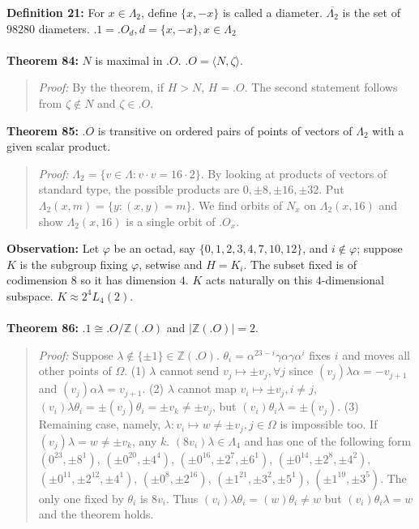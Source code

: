 {\bf Definition 21:}
For $x \in \Lambda_2$, define $\{ x , -x \}$ is called a diameter.
${\overline {\Lambda_2}}$ is the set of $98280$ diameters.
$.1= .O_d, d= \{x, -x \}, x \in \Lambda_2$ 
\\
\\
{\bf Theorem 84:} $N$ is maximal in $.O$.  $.O= \langle N, \zeta \rangle$.
\begin{quote}
\emph{Proof:} 
By the theorem, if $H>N$, $H=.O$.  The second statement follows from $\zeta \notin N$ and $\zeta \in .O$.
\end{quote}
{\bf Theorem 85:} 
$.O$ is transitive on ordered pairs of points of vectors of $\Lambda_2$ with a
given scalar product.
\begin{quote}
\emph{Proof:} 
$\Lambda_2= \{ v \in \Lambda: v \cdot v= 16 \cdot 2 \}$.  By looking at products of
vectors of standard type, the possible products are
$0, \pm 8, \pm 16, \pm 32$.  Put $\Lambda_2(x,m)= \{y: (x,y)= m \}$.
We find orbits of $N_x$ on $\Lambda_2(x,16)$ and show 
$\Lambda_2(x,16)$ is a single orbit of $.O_x$.
\end{quote}
{\bf Observation:}
Let $\varphi$ be an octad, say $\{ 0,1,2,3,4,7,10,12 \}$,
and $i \notin \varphi$; suppose $K$ is the subgroup fixing $\varphi$,
setwise and $H= K_i$.  The subset fixed is of codimension $8$ so it has dimension $4$.  $K$
acts naturally on this $4$-dimensional subspace.  $K \approx 2^4 L_4(2)$.
\\
\\
{\bf Theorem 86:} 
$.1 \cong .O/{\mathbb Z}(.O)$ and
$|{\mathbb Z}(.O)|= 2$.
\begin{quote}
\emph{Proof:} 
Suppose $\lambda \notin \{\pm1\} \in {\mathbb Z}(.O)$.
$\theta_i= \alpha^{23-i} \gamma \alpha  \gamma \alpha^i $ fixes $i$ and moves all other
points of $\Omega$.  
(1) $\lambda$ cannot send $v_j \mapsto \pm v_j, \forall j$ since
$(v_j)\lambda \alpha = - v_{j+1}$ and
$(v_j)\alpha \lambda= v_{j+1}$.  
(2) $\lambda$ cannot map $v_i \mapsto \pm v_j, i \ne j$, 
$(v_i) \lambda \theta_i= \pm (v_j) \theta_i= \pm v_k \ne \pm  v_j$, but
$(v_i) \theta_i \lambda= \pm (v_j)$.
(3) Remaining case, namely, $\lambda: v_i \mapsto w \ne \pm v_j, j \in \Omega$ is impossible too.
If $(v_j)\lambda = w \ne \pm v_k$, any $k$.  $(8v_i)\lambda \in \Lambda_4$ and has one of the following
form $(0^{23},\pm 8^{1})$, $(\pm 0^{20},\pm 4^{4})$, $(\pm 0^{16},\pm 2^{7}, \pm 6^{1})$,
$(\pm 0^{14},\pm 2^{8}, \pm 4^{2})$, $(\pm 0^{11},\pm 2^{12}, \pm 4^{1})$, $(\pm 0^{8},\pm 2^{16})$,
$(\pm 1^{21},\pm 3^{2}, \pm 5^{1})$, $(\pm 1^{19},\pm 3^{5})$.  The only one fixed by $\theta_i$ is
$8v_i$.  Thus
$(v_i) \lambda \theta_i = (w)\theta_i \ne w$ but
$(v_i) \theta_i \lambda= w$ and the theorem holds.
\end{quote}
